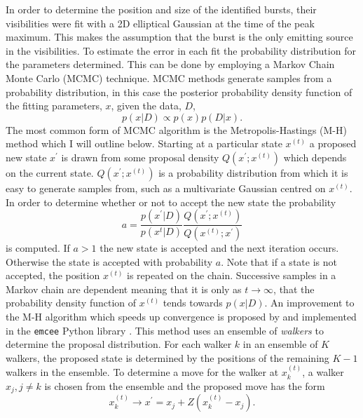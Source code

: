 In order to determine the position and size of the identified bursts, their visibilities were fit with a 2D elliptical Gaussian at the time of the peak maximum. This makes the assumption that the burst is the only emitting source in the visibilities.
To estimate the error in each fit the probability distribution for the parameters determined. This can be done by employing a Markov Chain Monte Carlo (MCMC) technique. MCMC methods generate samples from a probability distribution, in this case the posterior probability density function of the fitting parameters, $x$, given the data, $D$,
\begin{equation}
\label{eq:pdf}
p(x \vert D) \propto p(x)p(D \vert x).
\end{equation}	
The most common form of MCMC algorithm is the Metropolis-Hastings (M-H) method which I will outline below. Starting at a particular state $x^{(t)}$ a proposed new state $x^\prime$ is drawn from some proposal density $Q(x^\prime;x^{(t)})$ which depends on the current state. $Q(x^\prime;x^{(t)})$ is a probability distribution from which it is easy to generate samples from, such as a multivariate Gaussian centred on $x^{(t)}$. In order to determine whether or not to accept the new state the probability
\begin{equation}
\label{eq:MHnewstate}
a = \frac{p(x^\prime \vert D)}{p(x^{t} \vert D)} \frac{Q(x^\prime;x^{(t)})}{Q(x^{(t)};x^\prime)}
\end{equation}
is computed. If $a > 1$ the new state is accepted and the next iteration occurs. Otherwise the state is accepted with probability $a$. Note that if a state is not accepted, the position $x^{(t)}$ is repeated on the chain. Successive samples in a Markov chain are dependent meaning that it is only as $t \rightarrow \infty$, that the probability density function of $x^{(t)}$ tends towards $p(x \vert D)$. An improvement to the M-H algorithm which speeds up convergence is proposed by \cite{Goodman2010} and implemented in the \texttt{emcee} Python library \citep{Foreman-Mackey2012}. This method uses an ensemble of \textit{walkers} to determine the proposal distribution. For each walker $k$ in an ensemble of $K$ walkers, the proposed state is determined by the positions of the remaining $K-1$ walkers in the ensemble. To determine a move for the walker at $x_k^{(t)}$, a walker $x_j, j \neq k$ is chosen from the ensemble and the proposed move has the form
\begin{equation}
\label{eq:MCMC_walkers}
x_k^{(t)} \rightarrow x^\prime = x_j + Z(x_k^{(t)} - x_j).
\end{equation}
